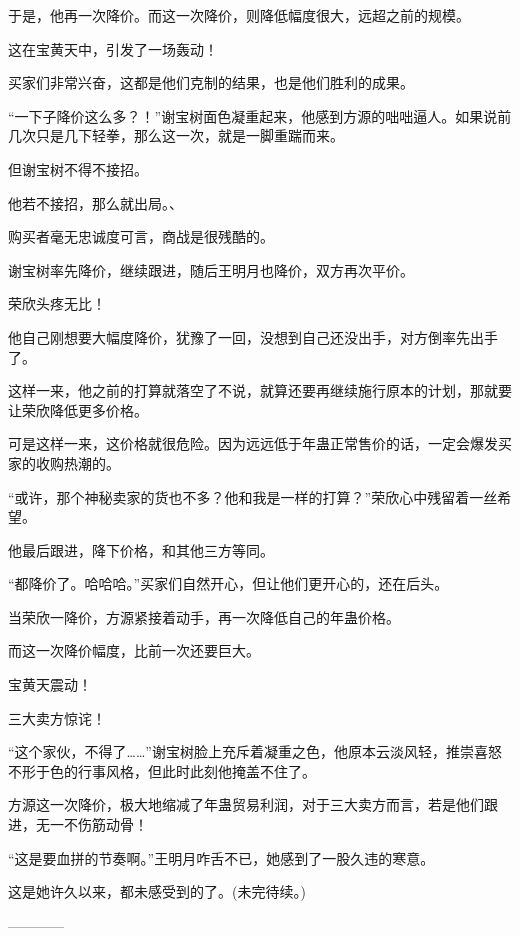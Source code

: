 \begin{this_body}
于是，他再一次降价。而这一次降价，则降低幅度很大，远超之前的规模。

这在宝黄天中，引发了一场轰动！

买家们非常兴奋，这都是他们克制的结果，也是他们胜利的成果。

“一下子降价这么多？！”谢宝树面色凝重起来，他感到方源的咄咄逼人。如果说前几次只是几下轻拳，那么这一次，就是一脚重踹而来。

但谢宝树不得不接招。

他若不接招，那么就出局。、

购买者毫无忠诚度可言，商战是很残酷的。

谢宝树率先降价，继续跟进，随后王明月也降价，双方再次平价。

荣欣头疼无比！

他自己刚想要大幅度降价，犹豫了一回，没想到自己还没出手，对方倒率先出手了。

这样一来，他之前的打算就落空了不说，就算还要再继续施行原本的计划，那就要让荣欣降低更多价格。

可是这样一来，这价格就很危险。因为远远低于年蛊正常售价的话，一定会爆发买家的收购热潮的。

“或许，那个神秘卖家的货也不多？他和我是一样的打算？”荣欣心中残留着一丝希望。

他最后跟进，降下价格，和其他三方等同。

“都降价了。哈哈哈。”买家们自然开心，但让他们更开心的，还在后头。

当荣欣一降价，方源紧接着动手，再一次降低自己的年蛊价格。

而这一次降价幅度，比前一次还要巨大。

宝黄天震动！

三大卖方惊诧！

“这个家伙，不得了……”谢宝树脸上充斥着凝重之色，他原本云淡风轻，推崇喜怒不形于色的行事风格，但此时此刻他掩盖不住了。

方源这一次降价，极大地缩减了年蛊贸易利润，对于三大卖方而言，若是他们跟进，无一不伤筋动骨！

“这是要血拼的节奏啊。”王明月咋舌不已，她感到了一股久违的寒意。

这是她许久以来，都未感受到的了。(未完待续。)

------------

\end{this_body}


